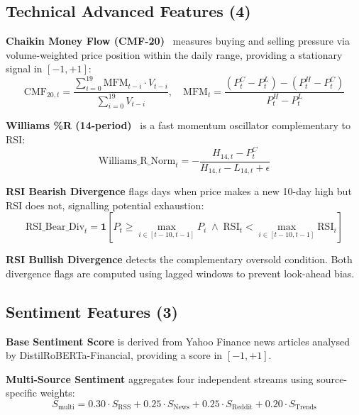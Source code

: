 \documentclass[10pt,a4paper,twoside]{article}
\begin{document}
\subsection{Technical Advanced Features (4)}

\textbf{Chaikin Money Flow (CMF-20)}~\cite{chaikin1978} measures buying and
selling pressure via volume-weighted price position within the daily range,
providing a stationary signal in $[-1, +1]$:
\begin{equation}
  \text{CMF}_{20,t} = \frac{\sum_{i=0}^{19} \text{MFM}_{t-i} \cdot V_{t-i}}
                          {\sum_{i=0}^{19} V_{t-i}}, \quad
  \text{MFM}_t = \frac{(P_t^C - P_t^L) - (P_t^H - P_t^C)}{P_t^H - P_t^L}
\end{equation}

\textbf{Williams \%R (14-period)}~\cite{williams1979} is a fast momentum
oscillator complementary to RSI:
\begin{equation}
  \text{Williams\_R\_Norm}_t = -\frac{H_{14,t} - P_t^C}{H_{14,t} - L_{14,t} + \epsilon}
\end{equation}

\textbf{RSI Bearish Divergence} flags days when price makes a new 10-day high
but RSI does not, signalling potential exhaustion:
\begin{equation}
  \text{RSI\_Bear\_Div}_t = \mathbf{1}\!\left[P_t \geq \max_{i \in [t-10,t-1]} P_i
  \;\wedge\; \text{RSI}_t < \max_{i \in [t-10,t-1]} \text{RSI}_i\right]
\end{equation}

\textbf{RSI Bullish Divergence} detects the complementary oversold condition.
Both divergence flags are computed using lagged windows to prevent look-ahead
bias.

\subsection{Sentiment Features (3)}

\textbf{Base Sentiment Score} is derived from Yahoo Finance news articles
analysed by DistilRoBERTa-Financial, providing a score in $[-1, +1]$.

\textbf{Multi-Source Sentiment} aggregates four independent streams using
source-specific weights:
\begin{equation}
  S_{\text{multi}} = 0.30 \cdot S_{\text{RSS}} + 0.25 \cdot S_{\text{News}}
                   + 0.25 \cdot S_{\text{Reddit}} + 0.20 \cdot S_{\text{Trends}}
\end{equation}
\end{document}
